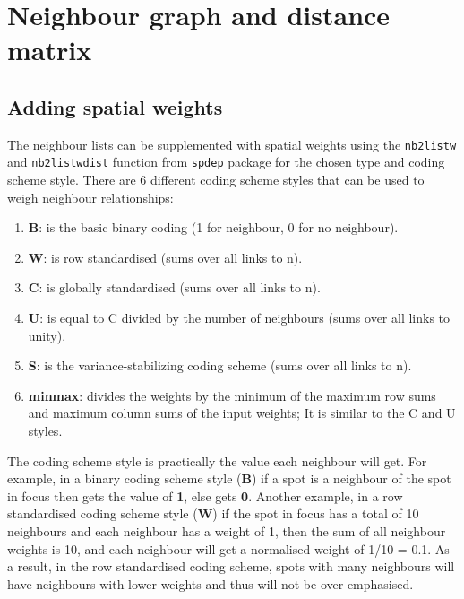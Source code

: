\documentclass[
]{book}
\providecommand{\tightlist}{%
  \setlength{\itemsep}{0pt}\setlength{\parskip}{0pt}}
\begin{document}
\hypertarget{neighbour-graph-and-distance-matrix}{%
\section{Neighbour graph and distance matrix}\label{neighbour-graph-and-distance-matrix}}

\hypertarget{adding-spatial-weights}{%
\subsection{Adding spatial weights}\label{adding-spatial-weights}}

The neighbour lists can be supplemented with spatial weights using the \texttt{nb2listw} and \texttt{nb2listwdist} function from \texttt{spdep} package for the chosen type and coding scheme style. There are 6 different coding scheme styles that can be used to weigh neighbour relationships:

\begin{enumerate}
\def\labelenumi{\arabic{enumi}.}
\tightlist
\item
  \textbf{B}: is the basic binary coding (1 for neighbour, 0 for no neighbour).
\item
  \textbf{W}: is row standardised (sums over all links to n).
\item
  \textbf{C}: is globally standardised (sums over all links to n).
\item
  \textbf{U}: is equal to C divided by the number of neighbours (sums over all links to unity).
\item
  \textbf{S}: is the variance-stabilizing coding scheme (sums over all links to n).
\item
  \textbf{minmax}: divides the weights by the minimum of the maximum row sums and maximum column sums of the input weights; It is similar to the C and U styles.
\end{enumerate}

The coding scheme style is practically the value each neighbour will get. For example, in a binary coding scheme style (\textbf{B}) if a spot is a neighbour of the spot in focus then gets the value of \textbf{1}, else gets \textbf{0}. Another example, in a row standardised coding scheme style (\textbf{W}) if the spot in focus has a total of 10 neighbours and each neighbour has a weight of 1, then the sum of all neighbour weights is 10, and each neighbour will get a normalised weight of 1/10 = 0.1. As a result, in the row standardised coding scheme, spots with many neighbours will have neighbours with lower weights and thus will not be over-emphasised.
\end{document}

